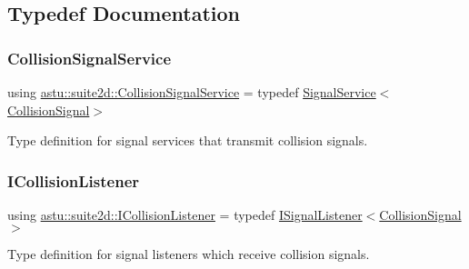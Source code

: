 \subsection{Typedef Documentation}
\mbox{\label{group__suite2d__group_ga0c9e81f269e1428bc82940c6c2682898}} 
\subsubsection{\texorpdfstring{Collision\+Signal\+Service}{CollisionSignalService}}
{\footnotesize\ttfamily using \hyperlink{group__suite2d__group_ga0c9e81f269e1428bc82940c6c2682898}{astu\+::suite2d\+::\+Collision\+Signal\+Service} = typedef \hyperlink{classastu_1_1SignalService}{Signal\+Service}$<$\hyperlink{classastu_1_1suite2d_1_1CollisionSignal}{Collision\+Signal}$>$}

Type definition for signal services that transmit collision signals. \mbox{\label{group__suite2d__group_ga089a780e9b5412a85eaf3c0f2e60a300}} 
\subsubsection{\texorpdfstring{I\+Collision\+Listener}{ICollisionListener}}
{\footnotesize\ttfamily using \hyperlink{group__suite2d__group_ga089a780e9b5412a85eaf3c0f2e60a300}{astu\+::suite2d\+::\+I\+Collision\+Listener} = typedef \hyperlink{classastu_1_1ISignalListener}{I\+Signal\+Listener}$<$\hyperlink{classastu_1_1suite2d_1_1CollisionSignal}{Collision\+Signal}$>$}

Type definition for signal listeners which receive collision signals. 